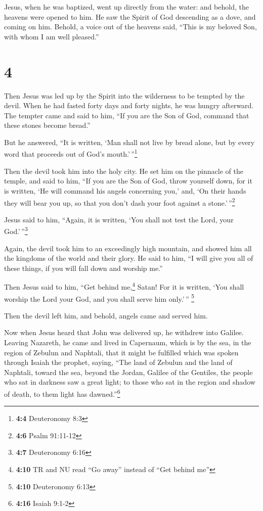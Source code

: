  Jesus, when he was baptized, went up directly from the
water: and behold, the heavens were opened to him. He saw the Spirit of
God descending as a dove, and coming on him.  Behold, a
voice out of the heavens said, ``This is my beloved Son, with whom I am
well pleased.''

\hypertarget{section-3}{%
\section{4}\label{section-3}}

 Then Jesus was led up by the Spirit into the wilderness
to be tempted by the devil.  When he had fasted forty days
and forty nights, he was hungry afterward.  The tempter
came and said to him, ``If you are the Son of God, command that these
stones become bread.''

 But he answered, ``It is written, `Man shall not live by
bread alone, but by every word that proceeds out of God's
mouth.'\,''\footnote{\textbf{4:4} Deuteronomy 8:3}

 Then the devil took him into the holy city. He set him on
the pinnacle of the temple,  and said to him, ``If you are
the Son of God, throw yourself down, for it is written, `He will command
his angels concerning you,' and, `On their hands they will bear you up,
so that you don't dash your foot against a stone.'\,''\footnote{\textbf{4:6}
  Psalm 91:11-12}

 Jesus said to him, ``Again, it is written, `You shall not
test the Lord, your God.'\,''\footnote{\textbf{4:7} Deuteronomy 6:16}

 Again, the devil took him to an exceedingly high
mountain, and showed him all the kingdoms of the world and their glory.
 He said to him, ``I will give you all of these things, if
you will fall down and worship me.''

 Then Jesus said to him, ``Get behind me,\footnote{\textbf{4:10}
  TR and NU read ``Go away'' instead of ``Get behind me''} Satan! For it
is written, `You shall worship the Lord your God, and you shall serve
him only.'\,'' \footnote{\textbf{4:10} Deuteronomy 6:13}

 Then the devil left him, and behold, angels came and
served him.

 Now when Jesus heard that John was delivered up, he
withdrew into Galilee.  Leaving Nazareth, he came and
lived in Capernaum, which is by the sea, in the region of Zebulun and
Naphtali,  that it might be fulfilled which was spoken
through Isaiah the prophet, saying,  ``The land of
Zebulun and the land of Naphtali, toward the sea, beyond the Jordan,
Galilee of the Gentiles,  the people who sat in darkness
saw a great light; to those who sat in the region and shadow of death,
to them light has dawned.''\footnote{\textbf{4:16} Isaiah 9:1-2}

